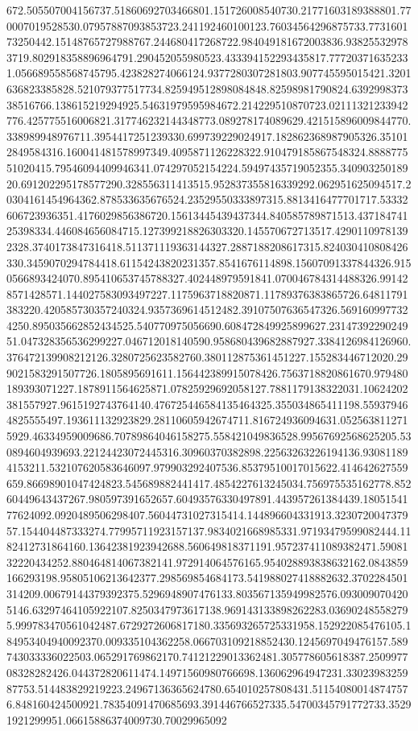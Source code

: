 672.505507004156737.51860692703466801.151726008540730.21771603189388801.770007019528530.07957887093853723.241192460100123.76034564296875733.773160173250442.15148765727988767.244680417268722.984049181672003836.938255329783719.802918358896964791.290452055980523.433394152293435817.777203716352331.056689558568745795.423828274066124.9377280307281803.907745595015421.3201636823385828.521079377517734.825949512898084848.82598981790824.639299837338516766.138615219294925.54631979595984672.214229510870723.02111321233942776.425775516006821.317746232144348773.089278174089629.421515896009844770.338989948976711.3954417251239330.699739229024917.182862368987905326.351012849584316.160041481578997349.4095871126228322.910479185867548324.888877551020415.79546094409946341.074297052154224.59497435719052355.34090325018920.691202295178577290.328556311413515.952837355816339292.062951625094517.20304161454964362.878533635676524.23529550333897315.8813416477701717.53332606723936351.4176029856386720.15613445439437344.840585789871513.43718474125398334.446084656084715.127399218826303320.145570672713517.42901109781392328.3740173847316418.511371119363144327.2887188208617315.824030410808426330.3459070294784418.61154243820231357.8541676114898.15607091337844326.9150566893424070.895410653745788327.402448979591841.070046784314488326.991428571428571.144027583093497227.1175963718820871.11789376383865726.64811791383220.420585730357240324.9357369614512482.39107507636547326.5691609977324250.895035662852434525.540770975056690.608472849925899627.2314739229024951.047328356536299227.046712018140590.958680439682887927.3384126984126960.376472139908212126.3280725623582760.380112875361451227.155283446712020.299021583291507726.1805895691611.156442389915078426.7563718820861670.979480189393071227.1878911564625871.07825929692058127.7881179138322031.10624202381557927.9615192743764140.476725446584135464325.355034865411198.559379464825555497.193611132923829.28110605942674711.816724936094631.0525638112715929.46334959009686.70789864046158275.558421049836528.99567692568625205.530894604939693.22124423072445316.30960370382898.22563263226194136.930811894153211.532107620583646097.979903292407536.85379510017015622.414642627559659.86698901047424823.545689882441417.4854227613245034.756975535162778.85260449643437267.980597391652657.60493576330497891.443957261384439.1805154177624092.0920489506298407.56044731027315414.144896604331913.323072004737957.154404487333274.77995711923157137.9834021668985331.97193479599082444.1182412731864160.13642381923942688.560649818371191.957237411089382471.5908132220434252.880464814067382141.972914064576165.954028893838632162.0843859166293198.95805106213642377.298569854684173.541988027418882632.3702284501314209.00679144379392375.5296948907476133.803567135949982576.0930090704205146.63297464105922107.8250347973617138.969143133898262283.036902485582795.999783470561042487.6729272606817180.335693265725331958.152922085476105.184953404940092370.009335104362258.066703109218852430.1245697049476157.589743033336022503.065291769862170.74121229013362481.305778605618387.250997708328282426.044372820611474.14971560980766698.136062964947231.3302398325987753.514483829219223.24967136365624780.654010257808431.511540800148747576.848160424500921.78354091470685693.391446766527335.54700345791772733.35291921299951.06615886374009730.70029965092